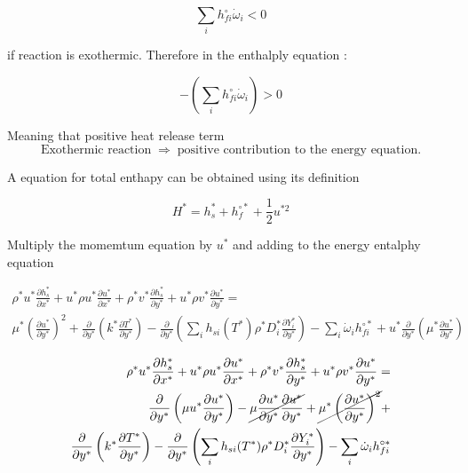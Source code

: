 \begin{equation} 
\sum_i h_{fi}^{\circ}\dot{\omega}_i < 0
\end{equation} 

if reaction is exothermic. Therefore in the enthalply equation :

\begin{equation} 
- \left( \sum_i h_{fi}^{\circ}\dot{\omega}_i \right) > 0
\end{equation} 

Meaning that positive heat release term
\begin{equation} 
\text{Exothermic reaction} \;\Rightarrow\;
\text{positive contribution to the energy equation}
.
\end{equation} 

A equation for total enthapy can be 
obtained using its definition 

\begin{equation} 
    H^{*}=h_s^{*}+h_f^{\circ*}+\frac{1}{2}u^{*2}
\end{equation} 

Multiply the momemtum equation by $u^{*}$ 
and adding to the energy entalphy equation 

\begin{equation}
\begin{split}
\rho^* u^* \frac{\partial h_s^*}{\partial x^*}
+
u^*
\rho u^*\frac{\partial u^*}{\partial x^*}
+
\rho^* v^* \frac{\partial h_s^*}{\partial y^*}
+
u^*
\rho v^*\frac{\partial u^*}{\partial y^*}
=
\\
\mu^*
\left(
\frac{\partial u^*}{\partial y^*}
\right)^2
+
\frac{\partial}{\partial y^*}
\left(
    k^*\frac{\partial T^*}{\partial y^*}
\right)
-
\frac{\partial}{\partial y^*}
\left(
        \sum_i
        h_{si}(T^*)
        \rho^* 
        D_i^*
        \frac{\partial Y_i^*}{\partial y^*}
\right)
-
\sum_i  
\dot{\omega}_i
h_{fi}^{\circ*}
+
u^*
\frac{\partial}{\partial y^*}
\left(\mu^*\frac{\partial u^*}{\partial y^*}\right)
\end{split}
\end{equation} 


\begin{equation}
\begin{split}
\rho^* u^* \frac{\partial h_s^*}{\partial x^*}
+
u^*
\rho u^*\frac{\partial u^*}{\partial x^*}
+
\rho^* v^* \frac{\partial h_s^*}{\partial y^*}
+
u^*
\rho v^*\frac{\partial u^*}{\partial y^*}
=
\\
\frac{\partial}{\partial y^*}
\left(
    \mu
    u^*
    \frac{\partial u^*}{\partial y^*}
\right)
-
\cancel{
\mu
\frac{\partial u^*}{\partial y^*}
\frac{\partial u^*}{\partial y^*}
}
+
\cancel{
\mu^*
\left(
\frac{\partial u^*}{\partial y^*}
\right)^2
}
+
\\
\frac{\partial}{\partial y^*}
\left(
    k^*\frac{\partial T^*}{\partial y^*}
\right)
-
\frac{\partial}{\partial y^*}
\left(
        \sum_i
        h_{si}(T^*)
        \rho^* 
        D_i^*
        \frac{\partial Y_i^*}{\partial y^*}
\right)
-
\sum_i  
\dot{\omega}_i
h_{fi}^{\circ*}
\end{split}
\end{equation} 

